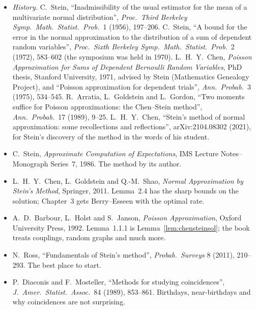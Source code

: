 \begin{itemize}
\item \emph{History.} C.~Stein, ``Inadmissibility of the usual estimator for the mean of a multivariate normal distribution'', \emph{Proc.\ Third Berkeley Symp.\ Math.\ Statist.\
Prob.}\ 1 (1956), 197--206. C.~Stein, ``A bound for the error in the normal approximation to the distribution of a sum of dependent random variables'',
\emph{Proc.\ Sixth Berkeley Symp.\ Math.\ Statist.\ Prob.}\ 2 (1972), 583--602 (the symposium was held in 1970). L.~H.~Y.~Chen, \emph{Poisson Approximation for Sums of Dependent Bernoulli
Random Variables}, PhD thesis, Stanford University, 1971, advised by Stein (Mathematics Genealogy Project), and ``Poisson approximation for dependent trials'',
\emph{Ann.\ Probab.}\ 3 (1975), 534--545. R.~Arratia, L.~Goldstein and L.~Gordon, ``Two moments suffice for Poisson approximations: the Chen--Stein method'',
\emph{Ann.\ Probab.}\ 17 (1989), 9--25. L.~H.~Y.~Chen, ``Stein's method of normal approximation: some recollections and reflections'', arXiv:2104.08302 (2021),
for Stein's discovery of the method in the words of his student.
\item C.~Stein, \emph{Approximate Computation of Expectations}, IMS Lecture Notes--Monograph Series~7, 1986. The method by its author.
\item L.~H.~Y.~Chen, L.~Goldstein and Q.-M.~Shao, \emph{Normal Approximation by Stein's Method}, Springer, 2011. Lemma~2.4 has the sharp bounds on the solution;
Chapter~3 gets Berry--Esseen with the optimal rate.
\item A.~D.~Barbour, L.~Holst and S.~Janson, \emph{Poisson Approximation}, Oxford University Press, 1992. Lemma~1.1.1 is Lemma~\ref{lem:chensteinsol}; the book treats
couplings, random graphs and much more.
\item N.~Ross, ``Fundamentals of Stein's method'', \emph{Probab.\ Surveys} 8 (2011), 210--293. The best place to start.
\item P.~Diaconis and F.~Mosteller, ``Methods for studying coincidences'', \emph{J.\ Amer.\ Statist.\ Assoc.}\ 84 (1989), 853--861. Birthdays, near-birthdays and why
coincidences are not surprising.
\end{itemize}
